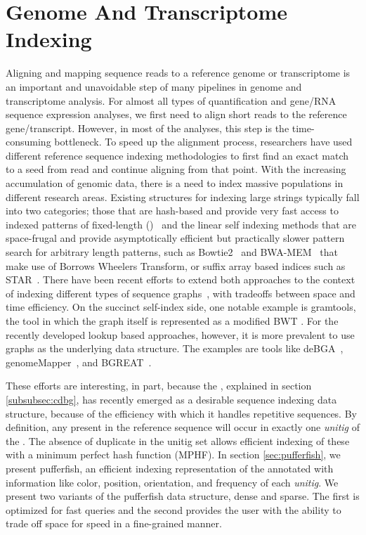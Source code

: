 \section{Genome And Transcriptome Indexing}
\label{subsec:indexing}
Aligning and mapping sequence reads to a reference genome or transcriptome is an important and unavoidable step of many pipelines in genome and transcriptome analysis. For almost all types of quantification and gene/RNA sequence expression analyses, we first need to align short reads to the reference gene/transcript. However, in most of the analyses, this step is the time-consuming bottleneck. To speed up the alignment process, researchers have used different reference sequence indexing methodologies to first find an exact match to a seed from read and continue aligning from that point. With the increasing accumulation of genomic data, there is a need to index massive populations in different research areas. Existing structures for indexing large strings typically fall into two categories; those that are hash-based and provide very fast access to indexed patterns of fixed-length (\kmers)~\cite{liao2013subread} and the linear self indexing methods that are space-frugal and provide asymptotically efficient but practically slower pattern search for arbitrary length patterns, such as Bowtie2~\cite{langmead2012fast} and BWA-MEM~\cite{li2013aligning} that make use of Borrows Wheelers Transform, or suffix array based indices such as STAR~\cite{dobin2013star}. There have been recent efforts to extend both approaches to the context of indexing different types of sequence graphs~\cite{paten2017genome}, with tradeoffs between space and time efficiency. On the succinct self-index side, one notable example is gramtools, the tool in which the graph itself is represented as a modified BWT \cite{maciuca2016natural}. For the recently developed \kmer lookup based approaches, however, it is more prevalent to use graphs as the underlying data structure. The examples are tools like deBGA~\cite{liu2016debga}, genomeMapper~\cite{schneeberger2009simultaneous}, and BGREAT~\cite{limasset2016read}. 

These efforts are interesting, in part, because the \ccdbg, explained in section \ref{subsubsec:cdbg}, has recently emerged as a desirable sequence indexing data structure, because of the efficiency with which it handles repetitive sequences. By definition, any \kmer present in the reference sequence will occur in exactly one \emph{unitig} of the \ccdbg. The absence of duplicate \kmers in the unitig set allows efficient indexing of these \kmers with a minimum perfect hash function (MPHF). In section \ref{sec:pufferfish}, we present pufferfish, an efficient indexing representation of the \ccdbg annotated with information like color, position, orientation, and frequency of each \emph{unitig}. We present two variants of the pufferfish data structure, dense and sparse. The first is optimized for fast queries and the second provides the user with the ability to trade off space for speed in a fine-grained manner.
